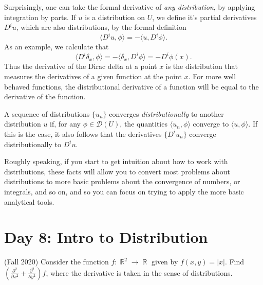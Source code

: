 \documentclass[answers]{exam}
\DeclareMathOperator{\RR}{\mathbb{R}}
\begin{document}
\begin{questions}
Surprisingly, one can take the formal derivative of \emph{any distribution}, by applying integration by parts. If $u$ is a distribution on $U$, we define it's partial derivatives $D^i u$, which are also distributions, by the formal definition
%
\[ \langle D^i u, \phi \rangle = - \langle u, D^i \phi \rangle. \]
%
As an example, we calculate that
%
\[ \langle D^i \delta_x, \phi \rangle = - \langle \delta_x, D^i \phi \rangle = - D^i \phi(x). \]
%
Thus the derivative of the Dirac delta at a point $x$ is the distribution that measures the derivatives of a given function at the point $x$. For more well behaved functions, the distributional derivative of a function will be equal to the derivative of the function.

A sequence of distributions $\{ u_n \}$ converges \emph{distributionally} to another distribution $u$ if, for any $\phi \in \mathcal{D}(U)$, the quantities $\langle u_n, \phi \rangle$ converge to $\langle u, \phi \rangle$. If this is the case, it also follows that the derivatives $\{ D^i u_n \}$ converge distributionally to $D^i u$.

Roughly speaking, if you start to get intuition about how to work with distributions, these facts will allow you to convert most problems about distributions to more basic problems about the convergence of numbers, or integrals, and so on, and so you can focus on trying to apply the more basic analytical tools.







\newpage
\section{Day 8: Intro to Distribution}

\item (Fall 2020)
Consider the function $f:\RR^{2}\to \RR$ given by $f(x,y)=|x|$. Find $\left( \frac{\partial ^{2}}{\partial x^{2}}+ \frac{\partial ^{2}}{\partial y^{2}} \right)f$, where the derivative is taken in the sense of distributions.


\end{questions}
\end{document}
